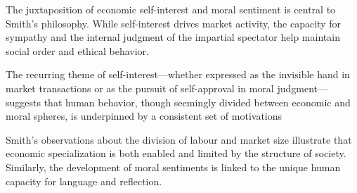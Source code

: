    \begin{remark}
        The juxtaposition of economic self-interest and moral sentiment is central to Smith’s philosophy. While self-interest drives market activity, the capacity for sympathy and the internal judgment of the impartial spectator help maintain social order and ethical behavior.
    \end{remark}

    \begin{remark}
        The recurring theme of self-interest—whether expressed as the invisible hand in market transactions or as the pursuit of self-approval in moral judgment—suggests that human behavior, though seemingly divided between economic and moral spheres, is underpinned by a consistent set of motivations
    \end{remark}

    \begin{remark}
        Smith’s observations about the division of labour and market size illustrate that economic specialization is both enabled and limited by the structure of society. Similarly, the development of moral sentiments is linked to the unique human capacity for language and reflection.
    \end{remark}